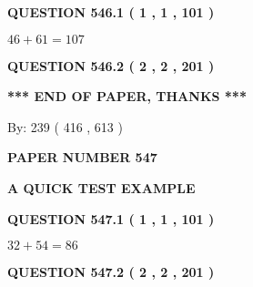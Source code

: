 \documentclass[12pt]{article}
\begin{document}
{\textbf{\Large{QUESTION
546.1 
 ( 1 , 1 , 101 )
}}}
  
  
 
 

$ %
46 +  %
61=   %
107$
 
 
  
\vspace{0.2in}
  
{\textbf{\Large{QUESTION
546.2 
 ( 2 , 2 , 201 )
}}}
  
  
   
   
 \vspace{0.2in}
 
   
   
   
   
\vspace{1.0in} 
{\textbf{\large{ *** END OF PAPER, THANKS *** }}} 
   
   
\hspace{1.0in} By: 
 239 ( 416 ,  613 )
   
   
   
   
\newpage 
\setcounter{page}{ 
   547001 } 
   
   
   
   
 {\textbf{ \Large{ PAPER NUMBER  547  }}}
   
   
\vspace{0.2in}
   
   
   
   
   
   
 \vspace{0.2in}
{\LARGE {\textbf{ A QUICK TEST EXAMPLE}}}
   
   
  
\vspace{0.2in}
  
{\textbf{\Large{QUESTION
547.1 
 ( 1 , 1 , 101 )
}}}
  
  
 
 

$ %
32 +  %
54=   %
86$
 
 
  
\vspace{0.2in}
  
{\textbf{\Large{QUESTION
547.2 
 ( 2 , 2 , 201 )
}}}
  
  
   
   
 \vspace{0.2in}
 
   
   
\end{document}
